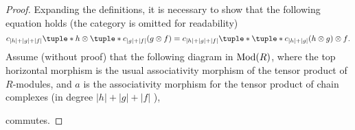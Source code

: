 \begin{proof}
    Expanding the definitions, it is necessary to show that the following equation holds (the category is omitted for readability)
    \begin{equation}
        \label{eq:dg-composition_associative}
        c_{|h| + |g| + |f|}\tuple*{h \otimes \tuple*{c_{|g| + |f|}(g \otimes f)}} = c_{|h| + |g| + |f|}\tuple*{\tuple*{c_{|h| + |g|}(h \otimes g)} \otimes f}.
    \end{equation}
    Assume (without proof) that the following diagram in \( \operatorname{Mod}(R) \), where the top horizontal morphism is the usual associativity morphism of the tensor product of \( R \)-modules, and \( a \) is the associativity morphism for the tensor product of chain complexes (in degree \( |h| + |g| + |f| \) ),
    \begin{center}
    \end{center}
    commutes.


\end{proof}
